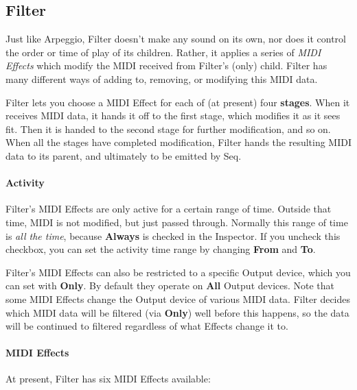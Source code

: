 \documentclass[twoside,10pt]{article}
\begin{document}
\subsection{Filter}

Just like Arpeggio, Filter doesn't make any sound on its own, nor does it control the order or time of play of its children.  Rather, it applies a series of {\it MIDI Effects} which modify the MIDI received from Filter's (only) child.  Filter has many different ways of adding to, removing, or modifying this MIDI data.  

Filter lets you choose a MIDI Effect for each of (at present) four {\bf stages}.  When it receives MIDI data, it hands it off to the first stage, which modifies it as it sees fit.  Then it is handed to the second stage for further modification, and so on.  When all the stages have completed modification, Filter hands the resulting MIDI data to its parent, and ultimately to be emitted by Seq.

\paragraph{Activity}

Filter's MIDI Effects are only active for a certain range of time.  Outside that time, MIDI is not modified, but just passed through.   Normally this range of time is {\it all the time}, because {\bf Always} is checked in the Inspector.  If you uncheck this checkbox, you can set the activity time range by changing {\bf From} and {\bf To}.  

Filter's MIDI Effects can also be restricted to a specific Output device, which you can set with {\bf Only}.    By default they operate on {\bf All} Output devices.  Note that some MIDI Effects change the Output device of various MIDI data.  Filter decides which MIDI data will be filtered (via {\bf Only}) well before this happens, so the data will be continued to filtered regardless of what Effects change it to.

\paragraph{MIDI Effects}

At present, Filter has six MIDI Effects available:
\end{document}
